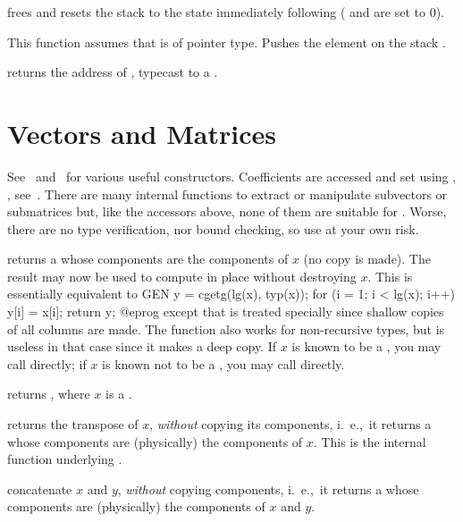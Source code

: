  frees  and resets the stack
to the state immediately following  ( and
 are set to $0$).

 This function assumes that
 is of pointer type. Pushes the element  on the stack .

 returns the address of ,
typecast to a .

\section{Vectors and Matrices}

See~ and~ for various useful constructors.
Coefficients are accessed and set using , ,
see~. There are many internal functions to extract or
manipulate subvectors or submatrices but, like the accessors above, none of
them are suitable for . Worse, there are no type
verification, nor bound checking, so use at your own risk.

 returns a  whose components are the
components of $x$ (no copy is made). The result may now be used to compute in
place without destroying $x$. This is essentially equivalent to
\bprog
  GEN y = cgetg(lg(x), typ(x));
  for (i = 1; i < lg(x); i++) y[i] = x[i];
  return y;
@eprog\noindent
except that  is treated specially since shallow copies of all columns
are made. The function also works for non-recursive types, but is useless
in that case since it makes a deep copy. If $x$ is known to be a , you
may call  directly; if $x$ is known not to be a ,
you may call  directly.

 returns , where $x$
is a .

 returns the transpose of $x$, \emph{without}
copying its components, i.~e.,~it returns a  whose components are
(physically) the components of $x$. This is the internal function underlying
.

 concatenate $x$ and $y$, \emph{without}
copying components, i.~e.,~it returns a  whose components are
(physically) the components of $x$ and $y$.

